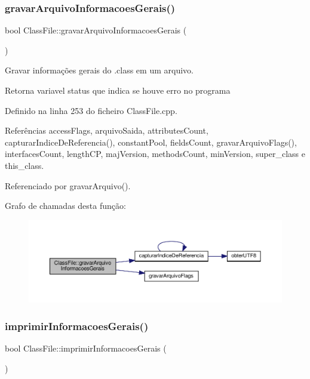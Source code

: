 \subsubsection{\texorpdfstring{gravar\+Arquivo\+Informacoes\+Gerais()}{gravarArquivoInformacoesGerais()}}
{\footnotesize\ttfamily bool Class\+File\+::gravar\+Arquivo\+Informacoes\+Gerais (\begin{DoxyParamCaption}{ }\end{DoxyParamCaption})}



Gravar informações gerais do .class em um arquivo. 

\begin{DoxyReturn}{Retorna}
variavel status que indica se houve erro no programa 
\end{DoxyReturn}


Definido na linha 253 do ficheiro Class\+File.\+cpp.



Referências access\+Flags, arquivo\+Saida, attributes\+Count, capturar\+Indice\+De\+Referencia(), constant\+Pool, fields\+Count, gravar\+Arquivo\+Flags(), interfaces\+Count, length\+CP, maj\+Version, methods\+Count, min\+Version, super\+\_\+class e this\+\_\+class.



Referenciado por gravar\+Arquivo().

Grafo de chamadas desta função\+:\nopagebreak
\begin{figure}[H]
\begin{center}
\leavevmode
\includegraphics[width=350pt]{classClassFile_a4a685afd10dc5aaacd5a71ed535895c6_cgraph}
\end{center}
\end{figure}
\mbox{\label{classClassFile_a482ed64fcd8a1b79d3622b3f59b5767a}} 
\subsubsection{\texorpdfstring{imprimir\+Informacoes\+Gerais()}{imprimirInformacoesGerais()}}
{\footnotesize\ttfamily bool Class\+File\+::imprimir\+Informacoes\+Gerais (\begin{DoxyParamCaption}{ }\end{DoxyParamCaption})}



